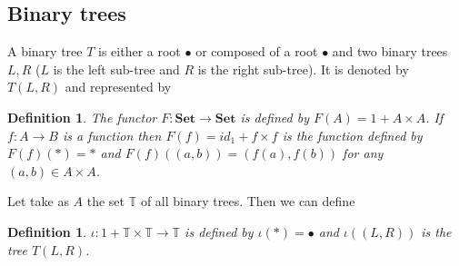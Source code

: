 \documentclass[11pt,a4paper]{article}
\newtheorem{defi}[theo]{Definition}
\newcommand{\gr}{\textbf}
\newcommand{\T}{\mathbb{T}}
\newcommand{\1}{\mathbbm{1}}
\begin{document}
\subsection*{Binary trees}
A binary tree $T$ is either a root $\bullet$ or composed of a root $\bullet$ and two  binary trees $L,R$ ($L$ is the left sub-tree and $R$ is the right sub-tree). It is denoted by $T(L,R)$ and represented by
\begin{center}
\end{center} 
\begin{defi}
The functor $F : \gr{Set} \to \gr{Set}$ is defined by $F(A) = 1 + A \times A$. If $f : A \to B$ is a function then $F(f) = id_1 + f \times f$ is the function defined by $F(f)(*) = *$ and $F(f)((a,b)) = (f(a),f(b))$ for any $(a,b) \in A \times A$.
\end{defi}
Let take as $A$ the set $\T$ of all binary trees. Then we can define
\begin{defi} $\iota : 1 + \T \times \T \to \T$ is defined by $\iota(*) = \bullet$ and $\iota((L,R))$ is the tree $T(L,R)$.
\end{defi}
\end{document}
